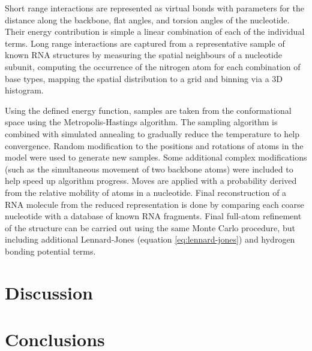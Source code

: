 \documentclass[journal]{IEEEtran}
\begin{document}
Short range interactions are represented as virtual bonds with parameters for the distance along the backbone, flat angles, and torsion angles of the nucleotide. Their energy contribution is simple a linear combination of each of the individual terms. Long range interactions are captured from a representative sample of known RNA structures by measuring the spatial neighbours of a nucleotide subunit, computing the occurrence of the nitrogen atom for each combination of base types, mapping the spatial distribution to a grid and binning via a 3D histogram. 

Using the defined energy function, samples are taken from the conformational space using the Metropolis-Hastings algorithm. The sampling algorithm is combined with simulated annealing to gradually reduce the temperature to help convergence. Random modification to the positions and rotations of atoms in the model were used to generate new samples. Some additional complex modifications (such as the simultaneous movement of two backbone atoms) were included to help speed up algorithm progress. Moves are applied with a probability derived from the relative mobility of atoms in a nucleotide. Final reconstruction of a RNA molecule from the reduced representation is done by comparing each coarse nucleotide with a database of known RNA fragments. Final full-atom refinement of the structure can be carried out using the same Monte Carlo procedure, but including additional Lennard-Jones (equation \ref{eq:lennard-jones}) and hydrogen bonding potential terms.

\section{Discussion}
\label{sec:discussion}


\section{Conclusions}
\label{sec:conclusion}


\end{document}
